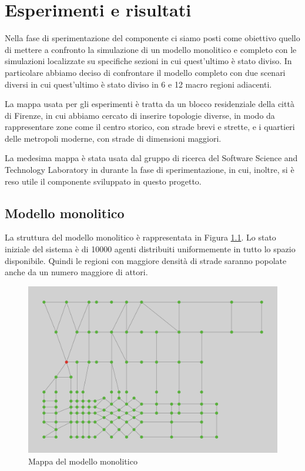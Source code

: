 \chapter{Esperimenti e risultati}

Nella fase di sperimentazione del componente ci siamo posti come obiettivo quello di mettere a confronto la simulazione di un modello monolitico e completo con le simulazioni localizzate su specifiche sezioni in cui quest'ultimo è stato diviso. In particolare abbiamo deciso di confrontare il modello completo con due scenari diversi in cui quest'ultimo è stato diviso in 6 e 12 macro regioni adiacenti.

La mappa usata per gli esperimenti è tratta da un blocco residenziale della città di Firenze, in cui abbiamo cercato di inserire topologie diverse, in modo da rappresentare zone come il centro storico, con strade brevi e strette, e i quartieri delle metropoli moderne, con strade di dimensioni maggiori.

La medesima mappa è stata usata dal gruppo di ricerca del Software Science and Technology Laboratory in \cite{esperimenti-sandro} durante la fase di sperimentazione, in cui, inoltre, si è reso utile il componente sviluppato in questo progetto.

\section{Modello monolitico}
La struttura del modello monolitico è rappresentata in Figura \ref{fig:immagine-mappa-completo}. Lo stato iniziale del sistema è di 10000 agenti distribuiti uniformemente in tutto lo spazio disponibile. Quindi le regioni con maggiore densità di strade saranno popolate anche da un numero maggiore di attori. 

\begin{figure}[htbp]
\centering
\includegraphics[width=\textwidth,height=\textheight,keepaspectratio]{images/mappa-completo.png}
\caption{Mappa del modello monolitico}
\label{fig:immagine-mappa-completo}
\end{figure}

